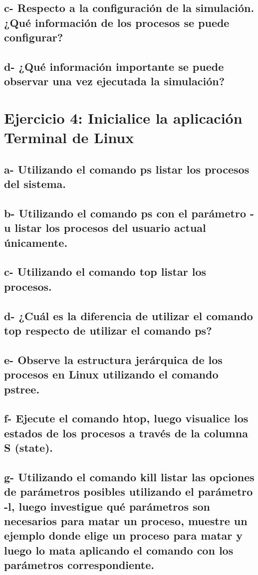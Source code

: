 \documentclass{article}
\begin{document}
\subsection*{c- Respecto a la configuración de la simulación. ¿Qué información de los procesos se puede
configurar?}
\subsection*{d- ¿Qué información importante se puede observar una vez ejecutada la simulación?}

\section*{Ejercicio 4: Inicialice la aplicación Terminal de Linux}


\subsection*{a- Utilizando el comando ps listar los procesos del sistema.}
\subsection*{b- Utilizando el comando ps con el parámetro -u listar los procesos del usuario actual únicamente.}
\subsection*{c- Utilizando el comando top listar los procesos.}
\subsection*{d- ¿Cuál es la diferencia de utilizar el comando top respecto de utilizar el comando ps?}
\subsection*{e- Observe la estructura jerárquica de los procesos en Linux utilizando el comando pstree.}
\subsection*{f- Ejecute el comando htop, luego visualice los estados de los procesos a través de la columna S (state).}
\subsection*{g- Utilizando el comando kill listar las opciones de parámetros posibles utilizando el parámetro -l, luego
investigue qué parámetros son necesarios para matar un proceso, muestre un ejemplo donde elige
un proceso para matar y luego lo mata aplicando el comando con los parámetros correspondiente.}

\end{document}
